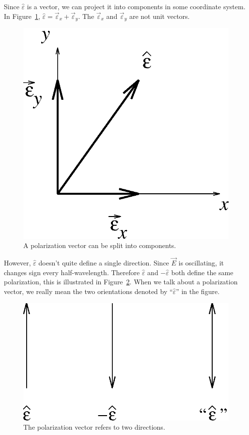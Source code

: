 Since $\hat{\varepsilon}$ is a vector, we can project it into components in 
some coordinate system. In Figure~\ref{fig:pol:component}, 
$\hat{\varepsilon}=\vec{\varepsilon}_x+\vec{\varepsilon}_y$. The 
$\vec{\varepsilon}_x$ and $\vec{\varepsilon}_y$ are not unit vectors. 
\begin{figure}[htb]
\centering 
\epsfxsize=4cm \includegraphics[scale=0.6]{7_polarization/polcomponent.eps}
\caption{A polarization vector can be split into components.}
\label{fig:pol:component}
\end{figure}
However, $\hat{\varepsilon}$ doesn't quite define a single direction. Since 
$\vec{E}$ is oscillating, it changes sign every half-wavelength.  Therefore 
$\hat{\varepsilon}$ and $-\hat{\varepsilon}$ both define the same polarization,
this is illustrated in Figure~\ref{fig:pol:polvect}. When we talk about a 
polarization vector, we really mean the two orientations denoted by 
``$\hat{\varepsilon}$'' in the figure.
\begin{figure}[htb]
\centering 
\epsfxsize=5cm \includegraphics[scale=0.6]{7_polarization/polvect.eps}
\caption{The polarization vector refers to two directions.}
\label{fig:pol:polvect}
\end{figure}
